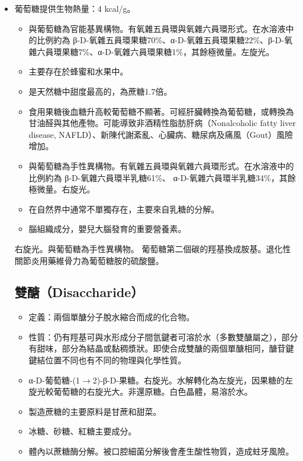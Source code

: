 \documentclass[a4paper,12pt]{report}
\begin{document}
\begin{itemize}
\item 葡萄糖提供生物熱量：4 kcal/g。
\eit
{}
\begin{itemize}
\item 與葡萄糖為官能基異構物。有氧雜五員環與氧雜六員環形式。在水溶液中的比例約為 β-D-氧雜五員環果糖70\%、α-D-氧雜五員環果糖22\%、β-D-氧雜六員環果糖7\%、α-D-氧雜六員環果糖1\%，其餘極微量。左旋光。
\item 主要存在於蜂蜜和水果中。
\item 是天然糖中甜度最高的，為蔗糖1.7倍。
\item 食用果糖後血糖升高較葡萄糖不顯著。可經肝臟轉換為葡萄糖，或轉換為甘油醛與其他產物。可能導致非酒精性脂肪肝病（Nonalcoholic fatty liver disease, NAFLD）、新陳代謝紊亂、心臟病、糖尿病及痛風（Gout）風險增加。
\end{itemize}
\begin{itemize}
\item 與葡萄糖為手性異構物。有氧雜五員環與氧雜六員環形式。在水溶液中的比例約為 β-D-氧雜六員環半乳糖61\%、 α-D-氧雜六員環半乳糖34\%，其餘極微量。右旋光。
\item 在自然界中通常不單獨存在，主要來自乳糖的分解。
\item 腦組織成分，嬰兒大腦發育的重要營養素。
\end{itemize}
右旋光。與葡萄糖為手性異構物。
葡萄糖第二個碳的羥基換成胺基。退化性關節炎用藥維骨力為葡萄糖胺的硫酸鹽。
\subsection{雙醣（Disaccharide）}
\begin{itemize}
\item 定義：兩個單醣分子脫水縮合而成的化合物。
\item 性質：仍有羥基可與水形成分子間氫鍵者可溶於水（多數雙醣屬之），部分有甜味，部分為結晶或黏稠漿狀。即使合成雙醣的兩個單醣相同，醣苷鍵鍵結位置不同也有不同的物理與化學性質。
\end{itemize}
\begin{itemize}
\item α-D-葡萄糖-(1$\to$2)-β-D-果糖。右旋光。水解轉化為左旋光，因果糖的左旋光較葡萄糖的右旋光大。非還原糖。白色晶體，易溶於水。
\item 製造蔗糖的主要原料是甘蔗和甜菜。
\item 冰糖、砂糖、紅糖主要成分。
\item 體內以蔗糖酶分解。被口腔細菌分解後會產生酸性物質，造成蛀牙風險。
\end{itemize}

\end{itemize}
\end{document}
